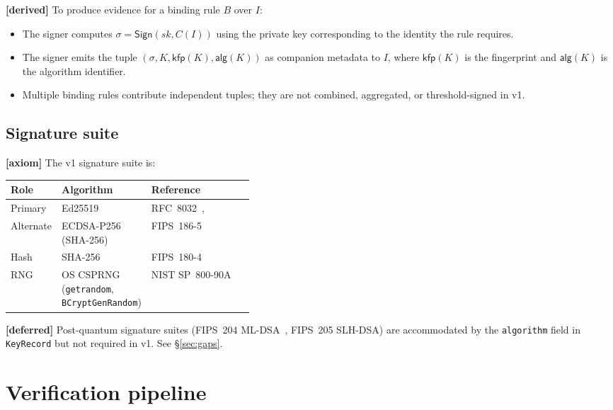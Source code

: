 \documentclass[11pt,a4paper]{article}
\newcommand{\axiom}{\textcolor{axiomcolor}{\textbf{[axiom]}}\xspace}
\newcommand{\derived}{\textcolor{derivedcolor}{\textbf{[derived]}}\xspace}
\newcommand{\deferred}{\textcolor{deferredcolor}{\textbf{[deferred]}}\xspace}
\begin{document}
\derived{} To produce evidence for a binding rule $B$ over $I$:

\begin{itemize}[leftmargin=2em,itemsep=0.15em]
    \item The signer computes $\sigma = \mathsf{Sign}(\mathit{sk}, C(I))$
    using the private key corresponding to the identity the rule
    requires.
    \item The signer emits the tuple
    $(\sigma, K, \mathsf{kfp}(K), \mathsf{alg}(K))$ as companion metadata
    to $I$, where $\mathsf{kfp}(K)$ is the fingerprint and
    $\mathsf{alg}(K)$ is the algorithm identifier.
    \item Multiple binding rules contribute independent tuples; they
    are not combined, aggregated, or threshold-signed in v1.
\end{itemize}

\subsection{Signature suite}

\axiom{} The v1 signature suite is:

\begin{center}
\renewcommand{\arraystretch}{1.25}
\begin{tabularx}{\linewidth}{L{0.18\linewidth} L{0.22\linewidth} X}
\toprule
\textbf{Role} & \textbf{Algorithm} & \textbf{Reference} \\
\midrule
Primary & Ed25519 & RFC~8032~\cite{rfc8032},
\cite{bernstein2012high} \\
Alternate & ECDSA-P256 (SHA-256) & FIPS~186-5~\cite{fips186-5} \\
Hash & SHA-256 & FIPS~180-4 \\
RNG & OS CSPRNG (\texttt{getrandom}, \texttt{BCryptGenRandom}) &
NIST SP~800-90A \\
\bottomrule
\end{tabularx}
\end{center}

\deferred{} Post-quantum signature suites (FIPS~204
ML-DSA~\cite{fips204}, FIPS~205 SLH-DSA) are accommodated by the
\texttt{algorithm} field in \texttt{KeyRecord} but not required in v1.
See \S\ref{sec:gaps}.

\section{Verification pipeline}
\label{sec:verify}
\end{document}
